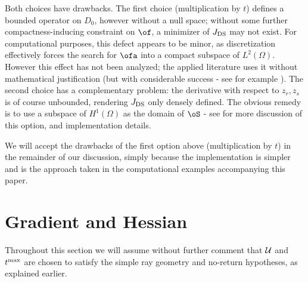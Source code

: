 Both choices have drawbacks. The first choice (multiplication by $t$)
defines a bounded operator on $D_0$, however without a null space;
without some further compactness-inducing constraint on $\of$, a
minimizer of $J_{\rm DS}$ may not exist. For computational purposes,
this defect appears to be minor, as discretization effectively forces
the search for $\ofa$ into a compact subspace of
$L^2(\Omega)$. However this effect has not been analyzed; the applied
literature uses it without mathematical justification (but with
considerable success - see for example \cite{Warner:16}). The second
choice has a complementary problem: the derivative with respect to
$z_r,z_s$ is of course unbounded, rendering $J_{\rm DS} $ only densely
defined. The obvious remedy is to use a subspace of $H^1(\Omega)$ as
the domain of $\oS$ - see \cite{KerSy:94} for more discussion of this
option, and implementation details. 

We will accept the drawbacks of the first option above (multiplication
by $t$) in the remainder of our discussion, simply because the
implementation is simpler and is the approach taken in the
computational examples accompanying this paper.

\section{Gradient and Hessian}

Throughout this section we will assume without further comment that
${\cal U}$ and $t^{\rm max}$ are chosen to satisfy the simple ray
geometry and no-return hypotheses, as explained earlier.

